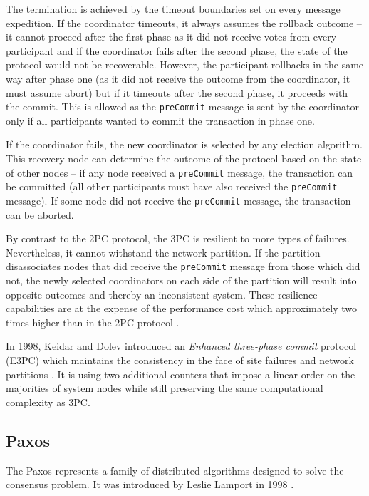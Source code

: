 \documentclass[oneside,
  digital, %
  table,   %
  lof,     %
  lot,     %
]{fithesis3}
\begin{document}
The termination is achieved by the timeout boundaries set on every message expedition. If the coordinator timeouts, it always assumes the rollback outcome -- it cannot proceed after the first phase as it did not receive votes from every participant and if the coordinator fails after the second phase, the state of the protocol would not be recoverable. However, the participant rollbacks in the same way after phase one (as it did not receive the outcome from the coordinator, it must assume abort) but if it timeouts after the second phase, it proceeds with the commit. This is allowed as the \texttt{preCommit} message is sent by the coordinator only if all participants wanted to commit the transaction in phase one.

If the coordinator fails, the new coordinator is selected by any election algorithm. This recovery node can determine the outcome of the protocol based on the state of other nodes -- if any node received a \texttt{preCommit} message, the transaction can be committed (all other participants must have also received the \texttt{preCommit} message). If some node did not receive the \texttt{preCommit} message, the transaction can be aborted.

By contrast to the 2PC protocol, the 3PC is resilient to more types of failures. Nevertheless, it cannot withstand the network partition. If the partition disassociates nodes that did receive the \texttt{preCommit} message from those which did not, the newly selected coordinators on each side of the partition will result into opposite outcomes and thereby an inconsistent system. These resilience capabilities are at the expense of the performance cost which approximately two times higher than in the 2PC protocol \cite{3PC}.

In 1998, Keidar and Dolev introduced an \textit{Enhanced three-phase commit} protocol (E3PC) which maintains the consistency in the face of site failures and network partitions \cite{E3PC}. It is using two additional counters that impose a linear order on the majorities of system nodes while still preserving the same computational complexity as 3PC. 


\subsection{Paxos}

The Paxos represents a family of distributed algorithms designed to solve the consensus problem. It was introduced by Leslie Lamport in 1998 \cite{Paxos}.
\end{document}

